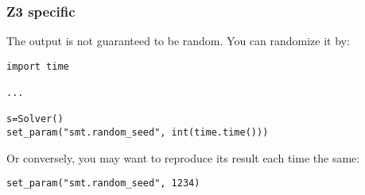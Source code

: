 \subsubsection{Z3 specific}

The output is not guaranteed to be random.
You can randomize it by:

\begin{lstlisting}
import time

...

s=Solver()
set_param("smt.random_seed", int(time.time()))
\end{lstlisting}

Or conversely, you may want to reproduce its result each time the same:

\begin{lstlisting}
set_param("smt.random_seed", 1234)
\end{lstlisting}
